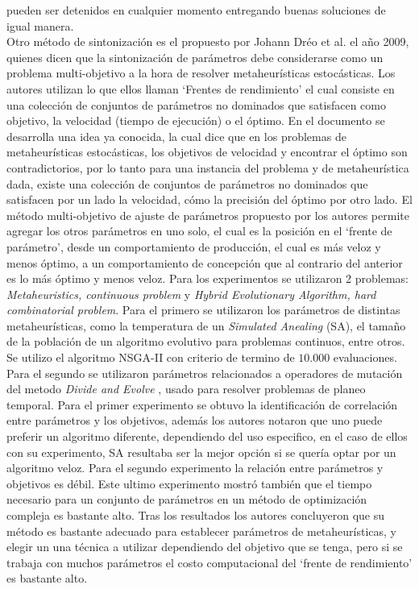 \documentclass[letter, 10pt]{article}
\begin{document}
\begin{multicols}{2}
pueden ser detenidos en cualquier momento entregando buenas soluciones de igual manera. \\



Otro método de sintonización es el propuesto por Johann Dréo et al. \cite{Dro2009UsingPF} el año 2009, quienes dicen que la sintonización de parámetros debe considerarse como un problema multi-objetivo a la hora de resolver metaheurísticas estocásticas. Los autores utilizan lo que ellos llaman `Frentes de rendimiento' el cual consiste en una colección de conjuntos de parámetros no dominados que satisfacen como objetivo, la velocidad (tiempo de ejecución) o el óptimo. En el documento se desarrolla una idea ya conocida, la cual dice que en los problemas de metaheurísticas estocásticas, los objetivos de velocidad y encontrar el óptimo son contradictorios, por lo tanto para una instancia del problema y de metaheurística dada, existe una colección de conjuntos de parámetros no dominados que satisfacen por un lado la velocidad, cómo la precisión del óptimo por otro lado. El método multi-objetivo de ajuste de parámetros propuesto por los autores permite agregar los otros parámetros en uno solo, el cual es la posición en el `frente de parámetro', desde un comportamiento de producción, el cual es más veloz y menos óptimo, a un comportamiento de concepción que al contrario del anterior es lo más óptimo y menos veloz. Para los experimentos se utilizaron 2 problemas: \textit{Metaheuristics, continuous problem} y \textit{Hybrid Evolutionary Algorithm, hard combinatorial problem}. Para el primero se utilizaron los parámetros de distintas metaheurísticas, como la temperatura de un \textit{Simulated Anealing} (SA), el tamaño de la población de un algoritmo evolutivo para problemas continuos, entre otros. Se utilizo el algoritmo NSGA-II \cite{Deb2002AFA} con criterio de termino de $10.000$ evaluaciones. Para el segundo se utilizaron parámetros relacionados a operadores de mutación del metodo \textit{Divide and Evolve} \cite{Schoenauer2006DivideandEvolveAN}, usado para resolver problemas de planeo temporal. Para el primer experimento se obtuvo la identificación de correlación entre parámetros y los objetivos, además los autores notaron que uno puede preferir un algoritmo diferente, dependiendo del uso especifico, en el caso de ellos con su experimento, SA resultaba ser la mejor opción si se quería optar por un algoritmo veloz. Para el segundo experimento la relación entre parámetros y objetivos es débil. Este ultimo experimento mostró también que el tiempo necesario para un conjunto de parámetros en un método de optimización compleja es bastante alto. Tras los resultados los autores concluyeron que su método es bastante adecuado para establecer parámetros de metaheurísticas, y elegir un una técnica a utilizar dependiendo del objetivo que se tenga, pero si se trabaja con muchos parámetros el costo computacional del `frente de rendimiento' es bastante alto.\\



\end{multicols}
\end{document}

